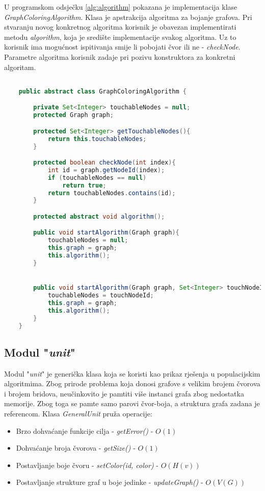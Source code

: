 \documentclass[times, utf8, diplomski, numeric]{fer}
\begin{document}
U programskom odsječku \ref{alg:algorithm} pokazana je implementacija klase \emph{GraphColoringAlgorithm}. Klasa je apstrakcija algoritma za bojanje grafova. Pri stvaranju novog konkretnog algoritma korisnik je obavezan implementirati metodu \emph{algorithm}, koja je središte implementacije svakog algoritma. Uz to korisnik ima mogućnost ispitivanja smije li pobojati čvor ili ne - \emph{checkNode}. Parametre algoritma korisnik zadaje pri pozivu konstruktora za konkretni algoritam.

\begin{singlespace}
	\begin{lstlisting}[label=alg:algorithm, language=Java, caption=Apstraktna klasa algoritma]

	public abstract class GraphColoringAlgorithm {

		private Set<Integer> touchableNodes = null;
		protected Graph graph;

		protected Set<Integer> getTouchableNodes(){
			return this.touchableNodes;
		}

		protected boolean checkNode(int index){
			int id = graph.getNodeId(index);
			if (touchableNodes == null)
				return true;
			return touchableNodes.contains(id);
		}

		protected abstract void algorithm();

		public void startAlgorithm(Graph graph){
			touchableNodes = null;
			this.graph = graph;
			this.algorithm();
		}


		public void startAlgorithm(Graph graph, Set<Integer> touchNodeId){
			touchableNodes = touchNodeId;
			this.graph = graph;
			this.algorithm();
		}
	}
	\end{lstlisting}
\end{singlespace}

\subsection{Modul "\emph{unit}"}

Modul "\emph{unit}" je generička klasa koja se koristi kao prikaz rješenja u populacijskim algoritmima. Zbog prirode problema koja donosi grafove s velikim brojem čvorova i brojem bridova, neučinkovito je pamtiti više instanci grafa zbog nedostatka memorije. Zbog toga se pamte samo parovi čvor-boja, a struktura grafa zadana je referencom. Klasa \emph{GeneralUnit} pruža operacije: 

\begin{itemize}
	\item Brzo dohvaćanje funkcije cilja - \emph{getError()} - $O(1)$
	\item Dohvaćanje broja čvorova - \emph{getSize()} - $O(1)$
	\item Postavljanje boje čvoru - \emph{setColor(id, color)} - $O(H(v))$
	\item Postavljanje strukture graf u boje jedinke - \emph{updateGraph()} - $O(V(G))$
\end{itemize}
\end{document}
